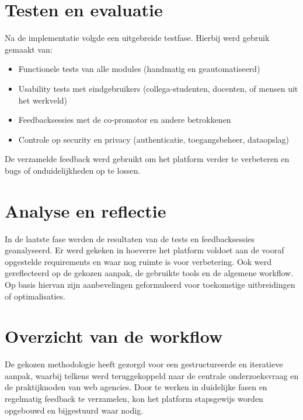 
\section{Testen en evaluatie}
Na de implementatie volgde een uitgebreide testfase. Hierbij werd gebruik gemaakt van:
\begin{itemize}
    \item Functionele tests van alle modules (handmatig en geautomatiseerd)
    \item Usability tests met eindgebruikers (collega-studenten, docenten, of mensen uit het werkveld)
    \item Feedbacksessies met de co-promotor en andere betrokkenen
    \item Controle op security en privacy (authenticatie, toegangsbeheer, dataopslag)
\end{itemize}

De verzamelde feedback werd gebruikt om het platform verder te verbeteren en bugs of onduidelijkheden op te lossen.

\section{Analyse en reflectie}
In de laatste fase werden de resultaten van de tests en feedbacksessies geanalyseerd. Er werd gekeken in hoeverre het platform voldoet aan de vooraf opgestelde requirements en waar nog ruimte is voor verbetering. Ook werd gereflecteerd op de gekozen aanpak, de gebruikte tools en de algemene workflow. Op basis hiervan zijn aanbevelingen geformuleerd voor toekomstige uitbreidingen of optimalisaties.

\section{Overzicht van de workflow}
De gekozen methodologie heeft gezorgd voor een gestructureerde en iteratieve aanpak, waarbij telkens werd teruggekoppeld naar de centrale onderzoeksvraag en de praktijknoden van web agencies. Door te werken in duidelijke fasen en regelmatig feedback te verzamelen, kon het platform stapsgewijs worden opgebouwd en bijgestuurd waar nodig.



